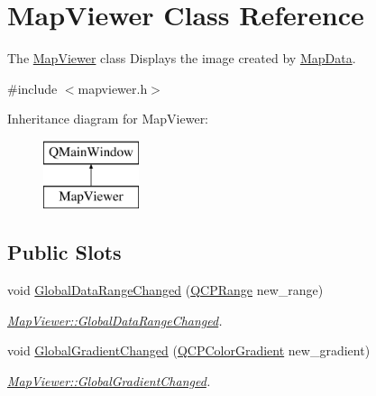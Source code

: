 \hypertarget{class_map_viewer}{}\section{Map\+Viewer Class Reference}
\label{class_map_viewer}


The \hyperlink{class_map_viewer}{Map\+Viewer} class Displays the image created by \hyperlink{class_map_data}{Map\+Data}.  




{\ttfamily \#include $<$mapviewer.\+h$>$}

Inheritance diagram for Map\+Viewer\+:\begin{figure}[H]
\begin{center}
\leavevmode
\includegraphics[height=2.000000cm]{class_map_viewer}
\end{center}
\end{figure}
\subsection*{Public Slots}
\begin{DoxyCompactItemize}
\item 
void \hyperlink{class_map_viewer_a07803ea58b8609639e9a9950021c041c}{Global\+Data\+Range\+Changed} (\hyperlink{class_q_c_p_range}{Q\+C\+P\+Range} new\+\_\+range)
\begin{DoxyCompactList}\small\item\em \hyperlink{class_map_viewer_a07803ea58b8609639e9a9950021c041c}{Map\+Viewer\+::\+Global\+Data\+Range\+Changed}. \end{DoxyCompactList}\item 
void \hyperlink{class_map_viewer_ad9fe700fcec6639713adb177c8775c6d}{Global\+Gradient\+Changed} (\hyperlink{class_q_c_p_color_gradient}{Q\+C\+P\+Color\+Gradient} new\+\_\+gradient)
\begin{DoxyCompactList}\small\item\em \hyperlink{class_map_viewer_ad9fe700fcec6639713adb177c8775c6d}{Map\+Viewer\+::\+Global\+Gradient\+Changed}. \end{DoxyCompactList}\end{DoxyCompactItemize}
